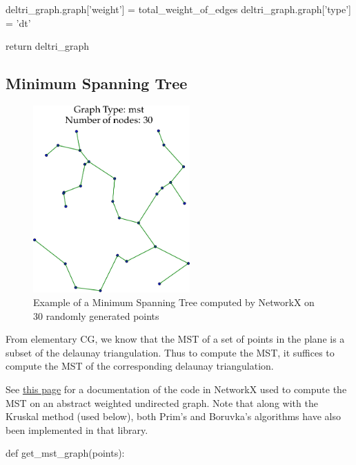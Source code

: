      deltri_graph.graph['weight'] = total_weight_of_edges
     deltri_graph.graph['type']   = 'dt'

     return deltri_graph
\nwendcode{}\nwdocspar


\subsection{Minimum Spanning Tree}

\begin{figure}[ht]
  \centering
  \includegraphics[width=6cm]{./miscimages/mst-example.png}
  \caption{\label{fig:mst} Example of a Minimum Spanning Tree computed by NetworkX on 30 randomly generated points}
\end{figure}


From elementary CG, we know that the MST of a set of points in the 
plane is a subset of the delaunay triangulation. Thus to compute
the MST, it suffices to compute the MST of the corresponding 
delaunay triangulation. 

See 
\href{https://networkx.github.io/documentation/stable/reference/algorithms/generated/networkx.algorithms.tree.mst.minimum_spanning_edges.html}{this page}
for a documentation of the code in NetworkX used to compute the MST on an abstract weighted undirected graph. Note that along with 
the Kruskal method (used below), both Prim's and Boruvka's algorithms have also been implemented in that library. 

\nwenddocs{}\plusendmoddef\nwstartdeflinemarkup{}\nwenddeflinemarkup
def get_mst_graph(points):

